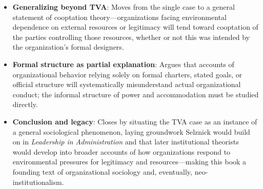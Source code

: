 \documentclass[12pt]{article}
\begin{document}
\begin{itemize}[leftmargin=*, itemsep=4pt]
    \item \textbf{Generalizing beyond TVA}: Moves from the single case to a general statement of cooptation theory---organizations facing environmental dependence on external resources or legitimacy will tend toward cooptation of the parties controlling those resources, whether or not this was intended by the organization's formal designers.
    \item \textbf{Formal structure as partial explanation}: Argues that accounts of organizational behavior relying solely on formal charters, stated goals, or official structure will systematically misunderstand actual organizational conduct; the informal structure of power and accommodation must be studied directly.
    \item \textbf{Conclusion and legacy}: Closes by situating the TVA case as an instance of a general sociological phenomenon, laying groundwork Selznick would build on in \textit{Leadership in Administration} and that later institutional theorists would develop into broader accounts of how organizations respond to environmental pressures for legitimacy and resources---making this book a founding text of organizational sociology and, eventually, neo-institutionalism.
\end{itemize}
\end{document}
